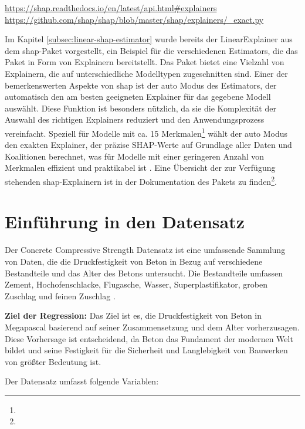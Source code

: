 \urldef{\shapurl}\url{https://shap.readthedocs.io/en/latest/api.html#explainers}
\urldef{\exacturl}\url{https://github.com/shap/shap/blob/master/shap/explainers/_exact.py}

Im Kapitel \ref{subsec:linear-shap-estimator} wurde bereits der LinearExplainer aus dem \textsf{shap}-Paket 
vorgestellt, ein Beispiel für die verschiedenen Estimators, die das Paket in Form von Explainern bereitstellt. 
Das Paket bietet eine Vielzahl von Explainern, die auf unterschiedliche Modelltypen zugeschnitten sind. 
Einer der bemerkenswerten Aspekte von \textsf{shap} ist der auto Modus des Estimators, 
der automatisch den am besten geeigneten Explainer für das gegebene Modell auswählt. 
Diese Funktion ist besonders nützlich, da sie die Komplexität der Auswahl des richtigen Explainers 
reduziert und den Anwendungsprozess vereinfacht. Speziell für Modelle mit ca. 15 Merkmalen\footnote{\exacturl} wählt der 
auto Modus den exakten Explainer, der präzise SHAP-Werte auf Grundlage aller Daten und Koalitionen berechnet, was für Modelle mit einer geringeren Anzahl 
von Merkmalen effizient und praktikabel ist \cite[S. 40f]{Molnar_2023}. Eine Übersicht der zur Verfügung stehenden \textsf{shap}-Explainern ist in der
Dokumentation des Pakets zu finden\footnote{\shapurl}. 


\section{Einführung in den Datensatz}


Der Concrete Compressive Strength Datensatz ist eine umfassende Sammlung von Daten, 
die die Druckfestigkeit von Beton in Bezug auf verschiedene Bestandteile und das Alter des Betons untersucht. 
Die Bestandteile umfassen Zement, Hochofenschlacke, Flugasche, Wasser, Superplastifikator, 
groben Zuschlag und feinen Zuschlag \cite{misc_concrete_compressive_strength_165}.

\textbf{Ziel der Regression:} Das Ziel ist es, die Druckfestigkeit von Beton in Megapascal basierend 
auf seiner Zusammensetzung und dem Alter vorherzusagen. Diese Vorhersage ist entscheidend, 
da Beton das Fundament der modernen Welt bildet und seine Festigkeit für die Sicherheit und 
Langlebigkeit von Bauwerken von größter Bedeutung ist.

Der Datensatz umfasst folgende Variablen:


